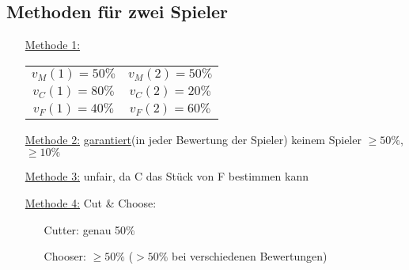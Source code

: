 \documentclass[a4paper,10pt]{scrartcl}
\begin{document}
\subsection{Methoden für zwei Spieler}
 \begin{itemize}
  \item[\underline{Methode 1:}] \begin{tabular}{cc}
                                 $v_M(1)=50\%$ & $v_M(2)=50\%$\\
                                 $v_C(1)=80\%$ & $v_C(2)=20\%$\\
                                 $v_F(1)=40\%$ & $v_F(2)=60\%$
                                \end{tabular}
  \item[\underline{Methode 2:}] \underline{garantiert}(in jeder Bewertung der Spieler) keinem Spieler $\geq50\%$, $\geq10\%$
  \item[\underline{Methode 3:}] unfair, da C das Stück von F bestimmen kann
  \item[\underline{Methode 4:}] Cut \& Choose: \begin{itemize}
                                               \item[]Cutter: genau 50\%
                                               \item[]Chooser: $\geq50\%$ ($>50\%$ bei verschiedenen Bewertungen) 
                                              \end{itemize}
 \end{itemize}

\end{document}
